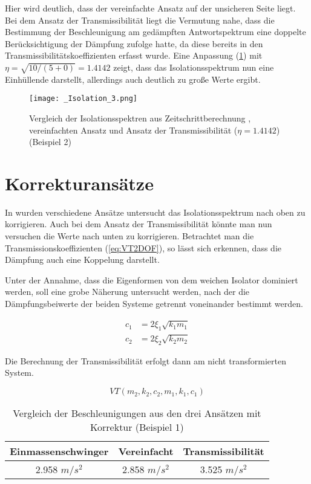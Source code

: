 Hier wird deutlich, dass der vereinfachte Ansatz auf der unsicheren Seite liegt.
Bei dem Ansatz der Transmissibilität liegt die Vermutung nahe, dass die Bestimmung der Beschleunigung am gedämpften Antwortspektrum eine doppelte Berücksichtigung der Dämpfung zufolge hatte, da diese bereits in den Transmissibilitätskoeffizienten erfasst wurde.
Eine Anpassung (\cref{fig:Isolation2}) mit $\eta = \sqrt{10/(5+0)} = 1.4142$ zeigt, dass das Isolationsspektrum nun eine Einhüllende darstellt, allerdings auch deutlich zu große Werte ergibt.

\begin{figure}[H]
    \centering
    \texttt{[image: \_Isolation\_3.png]}
    \caption{Vergleich der Isolationsspektren aus Zeitschrittberechnung \cite{Isemann}, vereinfachten Ansatz und Ansatz der Transmissibilität ($\eta = 1.4142$) (Beispiel 2)}
    \label{fig:Isolation2}
\end{figure}

\section{Korrekturansätze}
\label{sec:Korrekturansaetze}

In \cite{Isemann} wurden verschiedene Ansätze untersucht das Isolationsspektrum nach oben zu korrigieren.
Auch bei dem Ansatz der Transmissibilität könnte man nun versuchen die Werte nach unten zu korrigieren. Betrachtet man die Transmissionskoeffizienten (\cref{eq:VT2DOF}), so lässt sich erkennen, dass die Dämpfung auch eine Koppelung darstellt. 

Unter der Annahme, dass die Eigenformen von dem weichen Isolator dominiert werden, soll eine grobe Näherung untersucht werden, nach der die Dämpfungsbeiwerte der beiden Systeme getrennt voneinander bestimmt werden.

\begin{align*}
c_1 &= 2 \xi_1 \sqrt{k_1 m_1}\\
c_2 &= 2 \xi_2 \sqrt{k_2 m_2}
\end{align*}

Die Berechnung der Transmissibilität erfolgt dann am nicht transformierten System.

\begin{equation*}
VT(m_2, k_2, c_2, m_1, k_1, c_1)
\end{equation*} 

\begin{table}[H]
\centering
\begin{tabular}{ |c|c|c| } 
 \hline
 Einmassenschwinger & Vereinfacht & Transmissibilität\\
 \hline\hline
 2.958 $m/s^2$ & 2.858 $m/s^2$ & 3.525 $m/s^2$\\
 \hline
\end{tabular}
\caption{Vergleich der Beschleunigungen aus den drei Ansätzen mit Korrektur (Beispiel 1)}
\end{table}


